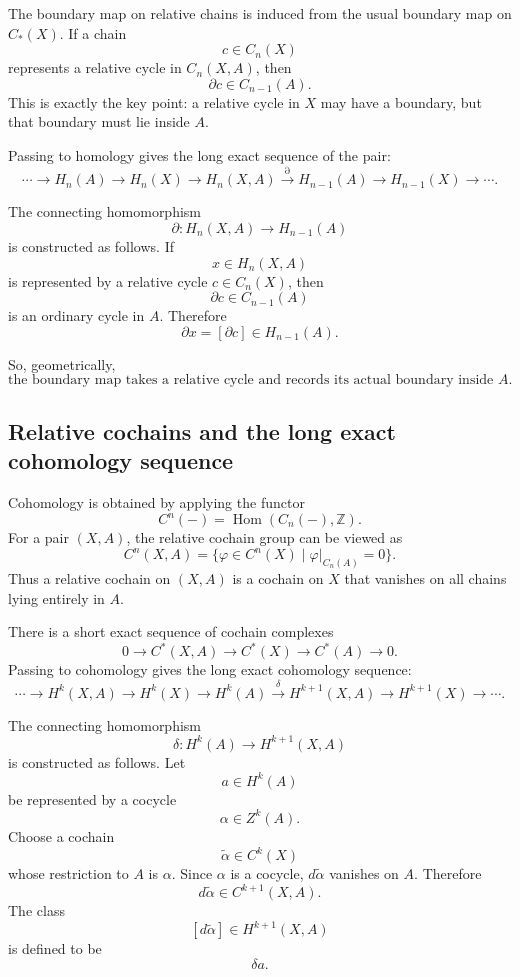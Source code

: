 \documentclass[12pt,a4paper]{article}
\theoremstyle{notespace}
\begin{document}
The boundary map on relative chains is induced from the usual boundary map on \(C_*(X)\). If a chain
\[
c\in C_n(X)
\]
represents a relative cycle in \(C_n(X,A)\), then
\[
\partial c\in C_{n-1}(A).
\]
This is exactly the key point: a relative cycle in \(X\) may have a boundary, but that boundary must lie inside \(A\).

Passing to homology gives the long exact sequence of the pair:
\[
\cdots
\longrightarrow
H_n(A)
\longrightarrow
H_n(X)
\longrightarrow
H_n(X,A)
\xrightarrow{\partial}
H_{n-1}(A)
\longrightarrow
H_{n-1}(X)
\longrightarrow
\cdots .
\]

The connecting homomorphism
\[
\partial:H_n(X,A)\longrightarrow H_{n-1}(A)
\]
is constructed as follows. If
\[
x\in H_n(X,A)
\]
is represented by a relative cycle \(c\in C_n(X)\), then
\[
\partial c\in C_{n-1}(A)
\]
is an ordinary cycle in \(A\). Therefore
\[
\partial x=[\partial c]\in H_{n-1}(A).
\]

So, geometrically,
\[
\boxed{
	\text{the boundary map takes a relative cycle and records its actual boundary inside }A.
}
\]

\subsection{Relative cochains and the long exact cohomology sequence}

Cohomology is obtained by applying the functor
\[
C^n(-)=\operatorname{Hom}(C_n(-),\mathbb Z).
\]
For a pair \((X,A)\), the relative cochain group can be viewed as
\[
C^n(X,A)
=
\{\varphi\in C^n(X)\mid \varphi|_{C_n(A)}=0\}.
\]
Thus a relative cochain on \((X,A)\) is a cochain on \(X\) that vanishes on all chains lying entirely in \(A\).

There is a short exact sequence of cochain complexes
\[
0
\longrightarrow
C^*(X,A)
\longrightarrow
C^*(X)
\longrightarrow
C^*(A)
\longrightarrow
0.
\]
Passing to cohomology gives the long exact cohomology sequence:
\[
\cdots
\longrightarrow
H^k(X,A)
\longrightarrow
H^k(X)
\longrightarrow
H^k(A)
\xrightarrow{\delta}
H^{k+1}(X,A)
\longrightarrow
H^{k+1}(X)
\longrightarrow
\cdots .
\]

The connecting homomorphism
\[
\delta:H^k(A)\longrightarrow H^{k+1}(X,A)
\]
is constructed as follows. Let
\[
a\in H^k(A)
\]
be represented by a cocycle
\[
\alpha\in Z^k(A).
\]
Choose a cochain
\[
\widetilde{\alpha}\in C^k(X)
\]
whose restriction to \(A\) is \(\alpha\). Since \(\alpha\) is a cocycle, \(d\widetilde{\alpha}\) vanishes on \(A\). Therefore
\[
d\widetilde{\alpha}\in C^{k+1}(X,A).
\]
The class
\[
[d\widetilde{\alpha}]\in H^{k+1}(X,A)
\]
is defined to be
\[
\delta a.
\]
\end{document}

